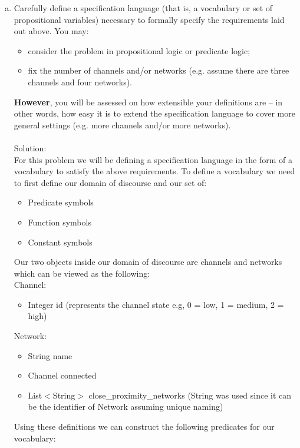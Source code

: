 \documentclass{article}
\newcommand*\moveToRight[1]{\hspace*{0em plus 1fill}\makebox{(#1)}}
\begin{document}
\begin{enumerate}[(a)]
        \item Carefully define a specification language (that is, a vocabulary or set of propositional variables) necessary to formally specify the requirements laid out above. You may:
        \begin{itemize}
            \item consider the problem in propositional logic or predicate logic;
            \item fix the number of channels and/or networks (e.g. assume there are three channels and four networks).
        \end{itemize}
        \textbf{However}, you will be assessed on how extensible your definitions are – in other words, how easy it is to extend the specification language to cover more general settings (e.g. more channels and/or more networks). \moveToRight{4 marks}\\\\
        Solution: \\
        For this problem we will be defining a specification language in the form of a vocabulary to satisfy the above requirements. To define a vocabulary we need to first define our domain of discourse and our set of: 
        \begin{itemize}
            \item Predicate symbols 
            \item Function symbols
            \item Constant symbols
        \end{itemize}
        Our two objects inside our domain of discourse are channels and networks which can be viewed as the following:\\
        Channel:
        \begin{itemize}
            \item Integer id (represents the channel state e.g, 0 = low, 1 = medium, 2 = high)  
        \end{itemize}
        Network:
        \begin{itemize}
            \item String name
            \item Channel connected
            \item List$<$String$>$ close\_proximity\_networks (String was used since it can be the identifier of Network assuming unique naming)
        \end{itemize}
        Using these definitions we can construct the following predicates for our vocabulary:
        

\end{enumerate}
\end{document}
